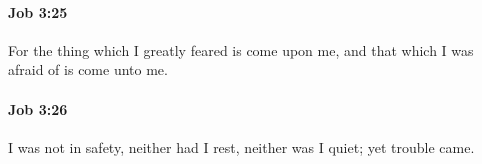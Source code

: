 		\paragraph{Job 3:25} %
			\label{JOB-3-25}

			For the thing which I greatly feared is come upon me, and that which I was afraid of is come unto me.


		\paragraph{Job 3:26} %
			\label{JOB-3-26}

			I was not in safety, neither had I rest, neither was I quiet; yet trouble came.

